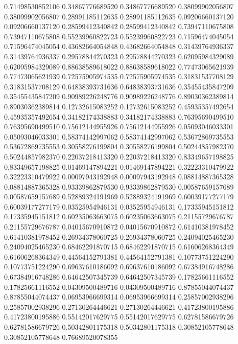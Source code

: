    0.71498530852106   0.34867776689520
   0.34867776689520   0.38099902056807
   0.38099902056807   0.28991185112635
   0.28991185112635   0.09206660137120
   0.09206660137120   0.28599412340842
   0.28599412340842   0.73947110675808
   0.73947110675808   0.55239960822723
   0.55239960822723   0.71596474045054
   0.71596474045054   0.43682664054848
   0.43682664054848   0.31439764936337
   0.31439764936337   0.29578844270323
   0.29578844270323   0.62095984329089
   0.62095984329089   0.88638589618022
   0.88638589618022   0.77473065621939
   0.77473065621939   0.72575905974535
   0.72575905974535   0.31831537708129
   0.31831537708129   0.64838393731636
   0.64838393731636   0.35455435847209
   0.35455435847209   0.90989226248776
   0.90989226248776   0.89030362389814
   0.89030362389814   0.12732615083252
   0.12732615083252   0.45935357492654
   0.45935357492654   0.34182174338883
   0.34182174338883   0.76395690499510
   0.76395690499510   0.75612144955926
   0.75612144955926   0.05093046033301
   0.05093046033301   0.58374142997062
   0.58374142997062   0.53672869735553
   0.53672869735553   0.30558276199804
   0.30558276199804   0.50244857982370
   0.50244857982370   0.22037218413320
   0.22037218413320   0.83349657198825
   0.83349657198825   0.01469147894221
   0.01469147894221   0.32223310479922
   0.32223310479922   0.00097943192948
   0.00097943192948   0.08814887365328
   0.08814887365328   0.93339862879530
   0.93339862879530   0.00587659157689
   0.00587659157689   0.52889324191969
   0.52889324191969   0.60039177277179
   0.60039177277179   0.03525954946131
   0.03525954946131   0.17335945151812
   0.17335945151812   0.60235063663075
   0.60235063663075   0.21155729676787
   0.21155729676787   0.04015670910872
   0.04015670910872   0.61410381978452
   0.61410381978452   0.26934378060725
   0.26934378060725   0.24094025465230
   0.24094025465230   0.68462291870715
   0.68462291870715   0.61606268364349
   0.61606268364349   0.44564152791381
   0.44564152791381   0.10773751224290
   0.10773751224290   0.69637610186092
   0.69637610186092   0.67384916748286
   0.67384916748286   0.64642507345739
   0.64642507345739   0.17825661116552
   0.17825661116552   0.04309500489716
   0.04309500489716   0.87855044074437
   0.87855044074437   0.06953966699314
   0.06953966699314   0.25857002938296
   0.25857002938296   0.27130264446621
   0.27130264446621   0.41723800195886
   0.41723800195886   0.55142017629775
   0.55142017629775   0.62781586679726
   0.62781586679726   0.50342801175318
   0.50342801175318   0.30852105778648
   0.30852105778648   0.76689520078355
